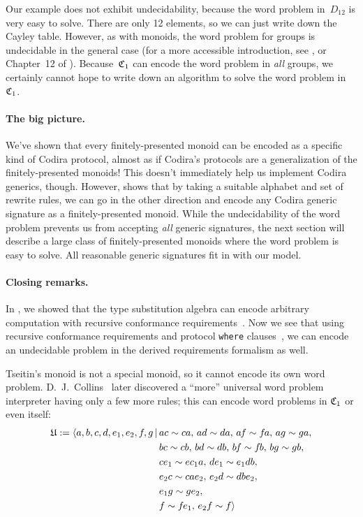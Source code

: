 \documentclass[../generics]{subfiles}
\begin{document}
Our example does not exhibit undecidability, because the word problem in~$D_{12}$ is very easy to solve. There are only 12 elements, so we can just write down the Cayley table. However, as with monoids, the word problem for groups is undecidable in the general case \cite{undecidablegroup} (for a more accessible introduction, see \cite{undecidablegroup2}, or Chapter~12 of \cite{rotman}). Because~$\mathfrak{C}_1$ can encode the word problem in \emph{all} groups, we certainly cannot hope to write down an algorithm to solve the word problem in~$\mathfrak{C}_1$.

\paragraph{The big picture.} We've shown that every finitely-presented monoid can be encoded as a specific kind of Codira protocol, almost as if Codira's protocols are a generalization of the finitely-presented monoids! This doesn't immediately help us implement Codira generics, though. However,  shows that by taking a suitable alphabet and set of rewrite rules, we can go in the other direction and encode any Codira generic signature as a finitely-presented monoid. While the undecidability of the word problem prevents us from accepting \emph{all} generic signatures, the next section will describe a large class of finitely-presented monoids where the word problem is easy to solve. All reasonable generic signatures fit in with our model.

\paragraph{Closing remarks.} In , we showed that the type substitution algebra can encode arbitrary computation with recursive conformance requirements~\cite{se0157}. Now we see that using recursive conformance requirements and protocol \texttt{where} clauses~\cite{se0142}, we can encode an undecidable problem in the derived requirements formalism as well.

Tseitin's monoid is not a special monoid, so it cannot encode its own word problem. D.~J.~Collins~\cite{universalsemigroup} later discovered a ``more'' universal word problem interpreter having only a few more rules; this can encode word problems in $\mathfrak{C}_1$ or even itself:
\begin{align*}
\mathfrak{U} := \langle  a,b,c,d,e_1,e_2,f\hspace{-0.08em} ,g\,|\,&ac\sim ca,\,ad\sim da,\,a\hspace{-0.08em} f\sim f\hspace{-0.08em} a,\,ag\sim ga,\\
&bc\sim cb,\, bd\sim db,\, b\hspace{-0.08em} f\sim f\hspace{-0.08em} b,\, bg\sim gb,\\
&ce_1\sim ec_1a,\, de_1\sim e_1db,\\
&e_2c\sim cae_2,\, e_2d\sim dbe_2,\\
&e_1g\sim ge_2,\\
&f\sim f\hspace{-0.08em} e_1,\, e_2f\sim f\rangle
\end{align*}
\end{document}
